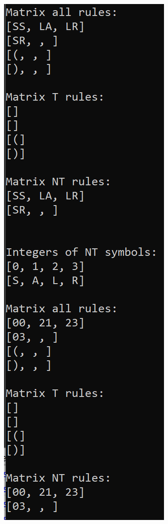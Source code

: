 \documentclass[a4paper, 11pt]{article}
\begin{document}
\begin{minipage}{0.6\textwidth}
\end{minipage}\begin{minipage}{0.2\textwidth}
\ 
\end{minipage}\begin{minipage}{0.3\textwidth}
\includegraphics[scale=0.7]{images/terminal_1.png}
\end{minipage}
\end{document}

